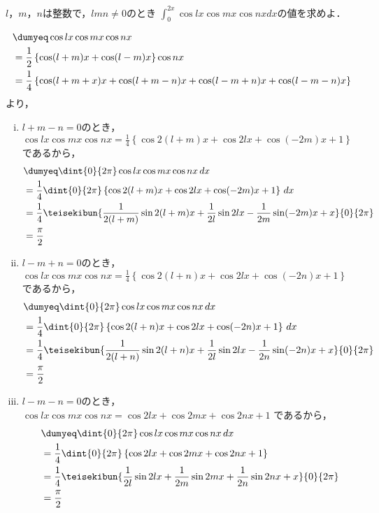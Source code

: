 
\begin{problem}
  $l$，$m$，$n$は整数で，$lmn\neq0$のとき
$\displaystyle\int_0^{2x}\cos lx\cos mx\cos nxdx$の値を求めよ．
\end{problem}

\begin{align*}
  &\dumyeq \cos lx  \cos mx  \cos nx \\
  &= \frac12 \left\{ \cos (l+m)x + \cos(l-m)x \right\}\cos nx\\
  &= \frac14
  \left\{ \cos (l+m+x)x + \cos (l+m-n)x + \cos (l-m+n)x + \cos (l-m-n)x \right\}
\end{align*}
より，
\begin{enumerate}[(i)]
  \item $l+m-n = 0$のとき，\\
  $\cos lx  \cos mx  \cos nx = \frac14 \left\{ \cos 2(l+m)x + \cos 2lx + \cos (-2m)x + 1 \right\}$
  であるから，
  \begin{align*}
    &\dumyeq \dint{0}{2\pi} \cos lx \cos mx \cos nx \,dx \\
    &= \frac14 \dint{0}{2\pi}
    \left\{ \cos 2(l+m)x + \cos 2lx + \cos(-2m)x + 1 \right\}\,dx \\
    &= \frac14 \teisekibun{\frac{1}{2(l+m)} \sin 2(l+m)x + \frac{1}{2l} \sin 2lx - \frac{1}{2m}\sin (-2m)x + x}{0}{2\pi} \\
    &= \frac{\pi}2
  \end{align*}

  \item $l-m+n = 0$のとき，\\
  $\cos lx \cos mx \cos nx = \frac14 \left\{ \cos 2(l+n)x + \cos 2lx + \cos(-2n)x + 1 \right\}$
  であるから，
  \begin{align*}
    &\dumyeq \dint{0}{2\pi} \cos lx \cos mx \cos nx \, dx \\
    &= \frac14 \dint{0}{2\pi} \left\{ \cos 2(l+n)x + \cos 2lx + \cos (-2n)x + 1 \right\}\, dx \\
    &= \frac14 \teisekibun{\frac{1}{2(l+n)} \sin 2(l+n)x + \frac{1}{2l}\sin 2lx - \frac{1}{2n} \sin (-2n)x + x}{0}{2\pi}\\
    &= \frac{\pi}2
  \end{align*}

  \item $l-m-n = 0$のとき，\\
  $\cos lx \cos mx \cos nx = \cos 2lx + \cos 2mx + \cos 2nx + 1$
  であるから，
  \begin{align*}
    &\dumyeq \dint{0}{2\pi} \cos lx \cos mx \cos nx \, dx \\
    &= \frac14\dint{0}{2\pi}
    \left\{ \cos 2lx + \cos 2mx + \cos 2nx + 1 \right\} \\
    &= \frac14 \teisekibun{\frac{1}{2l} \sin 2lx + \frac{1}{2m} \sin 2mx + \frac{1}{2n} \sin 2nx + x}{0}{2\pi} \\
    &= \frac{\pi}2
  \end{align*}


\end{enumerate}
